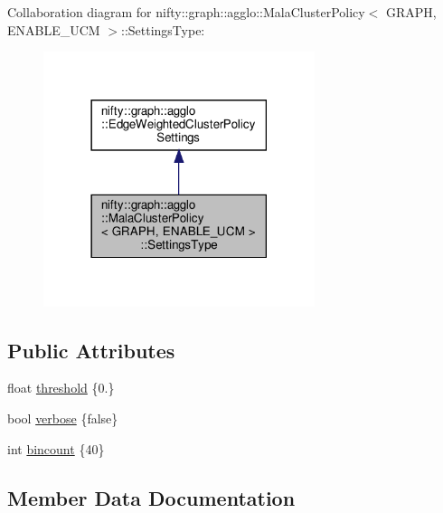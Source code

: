 Collaboration diagram for nifty\+:\+:graph\+:\+:agglo\+:\+:Mala\+Cluster\+Policy$<$ G\+R\+A\+PH, E\+N\+A\+B\+L\+E\+\_\+\+U\+CM $>$\+:\+:Settings\+Type\+:
\nopagebreak
\begin{figure}[H]
\begin{center}
\leavevmode
\includegraphics[width=225pt]{structnifty_1_1graph_1_1agglo_1_1MalaClusterPolicy_1_1SettingsType__coll__graph}
\end{center}
\end{figure}
\subsection*{Public Attributes}
\begin{DoxyCompactItemize}
\item 
float \hyperlink{structnifty_1_1graph_1_1agglo_1_1MalaClusterPolicy_1_1SettingsType_a3008e5ea72da713e65c96cea6fb391a5}{threshold} \{0.\}
\item 
bool \hyperlink{structnifty_1_1graph_1_1agglo_1_1MalaClusterPolicy_1_1SettingsType_a08b914f330c857e63fbff87edb429a2e}{verbose} \{false\}
\item 
int \hyperlink{structnifty_1_1graph_1_1agglo_1_1MalaClusterPolicy_1_1SettingsType_aeb00378f139a4740bf757057c7f1f349}{bincount} \{40\}
\end{DoxyCompactItemize}


\subsection{Member Data Documentation}
\mbox{\label{structnifty_1_1graph_1_1agglo_1_1MalaClusterPolicy_1_1SettingsType_aeb00378f139a4740bf757057c7f1f349}} 

